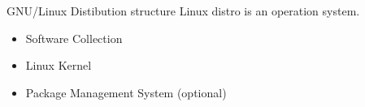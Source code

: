 \begin{frame}{GNU/Linux Distibution structure}
Linux distro is an \alert{operation system}. 
	\begin{itemize}
		\item Software Collection
		\item Linux Kernel
		\item Package Management System (optional)
	\end{itemize}
\end{frame}
